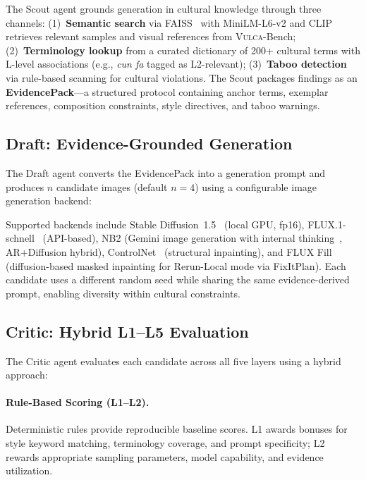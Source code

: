 \documentclass[sigconf, screen, review, anonymous]{acmart}
\newcommand{\vulca}{\textsc{Vulca}}
\newcommand{\Lx}[1]{L#1}
\begin{document}
The Scout agent grounds generation in cultural knowledge through three channels:
(1)~\textbf{Semantic search} via FAISS~\cite{johnson2019billion} with MiniLM-L6-v2 and CLIP~\cite{radford2021learning} retrieves relevant samples and visual references from \vulca{}-Bench;
(2)~\textbf{Terminology lookup} from a curated dictionary of 200+ cultural terms with L-level associations (e.g., \emph{cun fa} tagged as \Lx{2}-relevant);
(3)~\textbf{Taboo detection} via rule-based scanning for cultural violations.
The Scout packages findings as an \textbf{EvidencePack}---a structured protocol containing anchor terms, exemplar references, composition constraints, style directives, and taboo warnings.

\subsection{Draft: Evidence-Grounded Generation}
\label{sec:draft}

The Draft agent converts the EvidencePack into a generation prompt and produces $n$ candidate images (default $n{=}4$) using a configurable image generation backend:

Supported backends include Stable Diffusion~1.5~\cite{rombach2022high} (local GPU, fp16), FLUX.1-schnell~\cite{flux2024} (API-based), NB2 (Gemini image generation with internal thinking~\cite{team2024gemini}, AR+Diffusion hybrid), ControlNet~\cite{zhang2023adding} (structural inpainting), and FLUX Fill (diffusion-based masked inpainting for Rerun-Local mode via FixItPlan).
Each candidate uses a different random seed while sharing the same evidence-derived prompt, enabling diversity within cultural constraints.

\subsection{Critic: Hybrid \Lx{1}--\Lx{5} Evaluation}
\label{sec:critic}

The Critic agent evaluates each candidate across all five layers using a hybrid approach:

\paragraph{Rule-Based Scoring (\Lx{1}--\Lx{2}).}
Deterministic rules provide reproducible baseline scores.
\Lx{1} awards bonuses for style keyword matching, terminology coverage, and prompt specificity;
\Lx{2} rewards appropriate sampling parameters, model capability, and evidence utilization.
\end{document}
